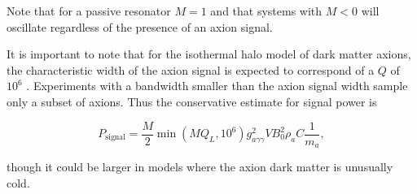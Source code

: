 \documentclass[aps,prl,twocolumn,groupedaddress]{revtex4-1}
\begin{document}
Note that for a passive resonator $M=1$ and that systems with $M<0$ will oscillate regardless of the presence of an axion signal. 


It is important to note that for the isothermal halo model of dark matter axions,  the characteristic width of the axion signal is expected to correspond of a $Q$ of $10^6$ \cite{Cavity_idea}.   Experiments with a bandwidth smaller than the axion signal width sample only a subset of axions.  Thus the conservative estimate for signal power is

\begin{equation}
\label{eqn:sig}
P_{\mathrm{signal}}=\frac{M}{2}\min\left(MQ_L,10^6\right)g_{a\gamma\gamma}^2VB_0^2\rho_aC\frac{1}{m_a},
\end{equation}

though it could be larger in models where the axion dark matter is unusually cold.

\end{document}
